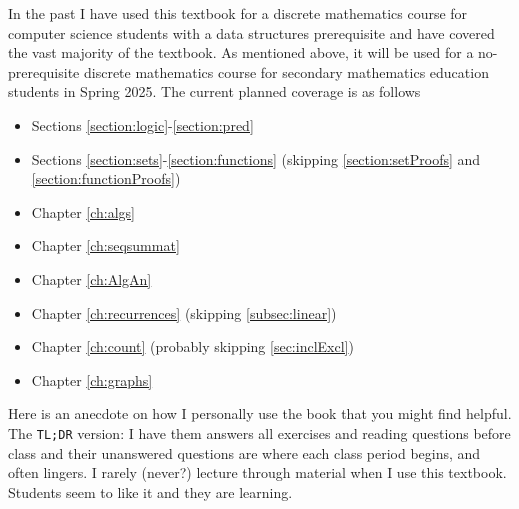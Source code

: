 In the past I have used this textbook for a discrete mathematics course
for computer science students with a data structures prerequisite and 
have covered the vast majority of the textbook.
As mentioned above, it will be used for a no-prerequisite discrete mathematics course for secondary
mathematics education students in Spring 2025. The current planned coverage is as follows
\begin{itemize}
\item 
Sections \ref{section:logic}-\ref{section:pred}
\item 
Sections \ref{section:sets}-\ref{section:functions} 
(skipping \ref{section:setProofs} and 
\ref{section:functionProofs})
\item Chapter \ref{ch:algs}
\item Chapter \ref{ch:seqsummat}
\item Chapter \ref{ch:AlgAn}
\item Chapter \ref{ch:recurrences} (skipping \ref{subsec:linear})
\item Chapter \ref{ch:count} (probably skipping \ref{sec:inclExcl})
\item Chapter \ref{ch:graphs}
\end{itemize}

Here is an anecdote on how I personally use the book that you might 
find helpful.
The \verb+TL;DR+ version: I have them answers all exercises
and reading questions before class
and their unanswered questions
are where each class period begins, and often lingers.
I rarely (never?) lecture through material when I use this textbook.
Students seem to like it and they are learning.

